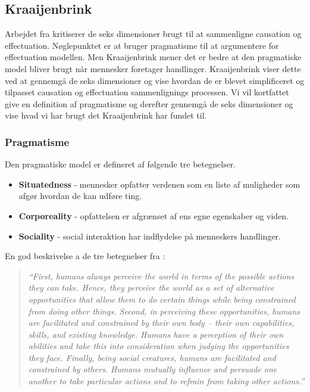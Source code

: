\subsection{Kraaijenbrink}
Arbejdet fra \citet{kraaijenbrink2012nature} kritiserer de seks dimensioner brugt til at sammenligne causation og effectuation.
Nøglepunktet er at \citet{sarasvathy2001effectuation} bruger pragmatisme til at argumentere for effectuation modellen.
Men Kraaijenbrink mener det er bedre at den pragmatiske model bliver brugt når mennesker foretager handlinger.
Kraaijenbrink viser dette ved at gennemgå de seks dimensioner og vise hvordan de er blevet simplificeret og tilpasset causation og effectuation sammenlignings processen.
Vi vil kortfattet give en definition af pragmatisme og derefter gennemgå de seks dimensioner og vise hvad vi har brugt det Kraaijenbrink har fundet til.

\subsubsection{Pragmatisme}
Den pragmatiske model er defineret af følgende tre betegnelser.
\begin{itemize}
\item \textbf{Situatedness} - mennesker opfatter verdenen som en liste af muligheder som afgør hvordan de kan udføre ting.
\item \textbf{Corporeality} - opfattelsen er afgrænset af ens egne egenskaber og viden.
\item \textbf{Sociality} - social interaktion har indflydelse på menneskers handlinger.
\end{itemize}
En god beskrivelse a de tre betegnelser fra \citet{kraaijenbrink2012nature}:
\begin{quote}
  \textit{``First, humans always perceive the world in terms of the possible actions they can take. Hence, they perceive the world as a set of alternative opportunities that allow them to do certain things while being constrained from doing other things. Second, in perceiving these opportunities, humans are facilitated and constrained by their own body – their own capabilities, skills, and existing knowledge. Humans have a perception of their own abilities and take this into consideration when judging the opportunities they face. Finally, being social creatures, humans are facilitated and constrained by others. Humans mutually influence and persuade one another to take particular actions and to refrain from taking other actions.''}
\end{quote}


